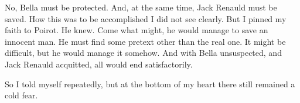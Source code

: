  No, Bella must be protected. And, at the same time, Jack Renauld must be saved. How this was to be accomplished I did not see clearly. But I pinned my faith to Poirot. He knew. Come what might, he would manage to save an innocent man. He must find some pretext other than the real one. It might be difficult, but he would manage it somehow. And with Bella unsuspected, and Jack Renauld acquitted, all would end satisfactorily. 

 So I told myself repeatedly, but at the bottom of my heart there still remained a cold fear.
